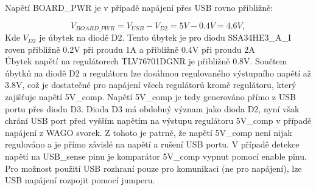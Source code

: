     Napětí BOARD\_PWR je v případě napájení přes USB rovno přibližně:
    
    \begin{equation}
        V_{BOARD\_PWR} = V_{USB} - V_{D2} = 5V - 0.4V = 4.6V,
    \end{equation}
    Kde $V_{D2}$ je úbytek na diodě D2. Tento úbytek je pro diodu SSA34HE3\_A\_I roven přibližně 0.2V při proudu 1A
    a přibližně 0.4V při proudu 2A\\

    Úbytek napětí na regulátorech TLV76701DGNR je přibližně 0.8V.
    Součtem úbytků na diodě D2 a regulátoru lze 
    dosáhnou regulovaného výstupního napětí až 3.8V, což je dostatečné pro napájení všech regulátorů
    kromě regulátoru, který zajišťuje napětí 5V\_comp. Napětí 5V\_comp je tedy generováno přímo z USB portu přes 
    diodu D3. Dioda D3 má obdobný význam jako dioda D2, nyní však chrání USB port před vyšším napětím na výstupu
    regulátoru 5V\_comp v případě napájení z WAGO svorek. Z tohoto je patrné, že napětí 5V\_comp není nijak regulováno
    a je přímo závislé na napětí a rušení USB portu.
    V případě detekce napětí na USB\_sense pinu je komparátor 5V\_comp vypnut pomocí enable pinu.\\

    Pro možnost použití USB rozhraní pouze pro komunikaci (ne pro napájení),
    lze USB napájení rozpojit pomocí jumperu.\\

    





